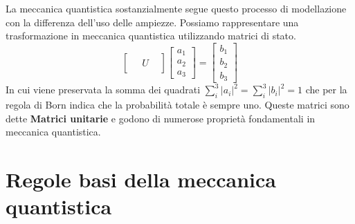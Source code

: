 \documentclass{article}
\begin{document}
    La meccanica quantistica sostanzialmente segue questo processo di modellazione con la differenza dell'uso delle ampiezze. Possiamo rappresentare una trasformazione in meccanica quantistica utilizzando matrici di stato.
    $$
        \begin{bmatrix}
            \\&U&\\
            \
        \end{bmatrix}
        \begin{bmatrix}
            a_1 \\a_2 \\ a_3 
        \end{bmatrix}
        = \begin{bmatrix}
            b_1 \\ b_2 \\ b_3
        \end{bmatrix}
    $$
    In cui viene preservata la somma dei quadrati $\sum^3_i |a_i|^2 = \sum^3_i |b_i|^2 = 1$ che per la regola di Born indica che la probabilità totale è sempre uno. Queste matrici sono dette \textbf{Matrici unitarie} e godono di numerose proprietà fondamentali in meccanica quantistica.

    \section{Regole basi della meccanica quantistica}
\end{document}
